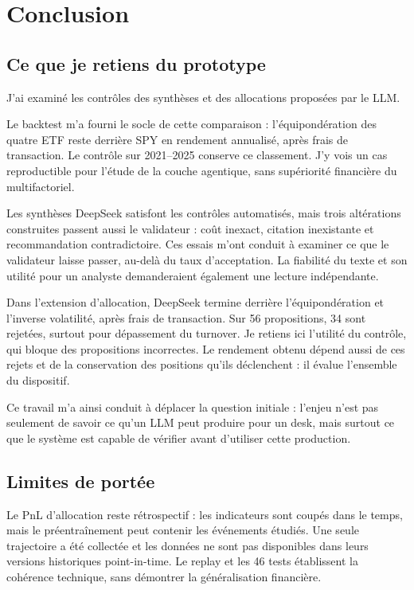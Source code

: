 \chapter{Conclusion}\label{cap:conclusion}

\section{Ce que je retiens du prototype}

J'ai examiné les contrôles des synthèses et des allocations proposées par le LLM.

Le backtest m'a fourni le socle de cette comparaison : l'équipondération des quatre ETF reste derrière SPY en rendement annualisé, après frais de transaction. Le contrôle sur 2021--2025 conserve ce classement. J'y vois un cas reproductible pour l'étude de la couche agentique, sans supériorité financière du multifactoriel.

Les synthèses DeepSeek satisfont les contrôles automatisés, mais trois altérations construites passent aussi le validateur : coût inexact, citation inexistante et recommandation contradictoire. Ces essais m'ont conduit à examiner ce que le validateur laisse passer, au-delà du taux d'acceptation. La fiabilité du texte et son utilité pour un analyste demanderaient également une lecture indépendante.

Dans l'extension d'allocation, DeepSeek termine derrière l'équipondération et l'inverse volatilité, après frais de transaction. Sur 56 propositions, 34 sont rejetées, surtout pour dépassement du turnover. Je retiens ici l'utilité du contrôle, qui bloque des propositions incorrectes. Le rendement obtenu dépend aussi de ces rejets et de la conservation des positions qu'ils déclenchent : il évalue l'ensemble du dispositif.

Ce travail m'a ainsi conduit à déplacer la question initiale : l'enjeu n'est pas seulement de savoir ce qu'un LLM peut produire pour un desk, mais surtout ce que le système est capable de vérifier avant d'utiliser cette production.

\section{Limites de portée}

Le PnL d'allocation reste rétrospectif : les indicateurs sont coupés dans le temps, mais le préentraînement peut contenir les événements étudiés. Une seule trajectoire a été collectée et les données ne sont pas disponibles dans leurs versions historiques point-in-time. Le replay et les 46 tests établissent la cohérence technique, sans démontrer la généralisation financière.

